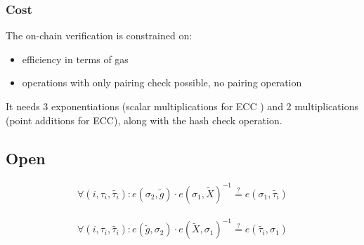 \documentclass[11pt]{article}
\newenvironment{optimization}{\par\color{blue}}{\par}
\begin{document}
    \subsubsection{Cost}
    \begin{optimization}
        The on-chain verification is constrained on:
        \begin{itemize}
            \item efficiency in terms of gas
            \item operations with only pairing check possible, no pairing operation
        \end{itemize}
        It needs 3 exponentiations (scalar multiplications for ECC ) and 2 multiplications (point additions for ECC), along with the hash check operation.
    \end{optimization}

    \subsection{Open}
    \begin{align}
        \forall (i, \tau_i, \tilde{\tau_i}) :
        e(\sigma_2,\tilde{g})\cdot e(\sigma_1, \tilde{X})^{-1}\stackrel{?}{=} e(\sigma_1, \tilde{\tau_i})
    \end{align}
    \begin{optimization}
        \begin{align}
            \forall (i, \tau_i, \tilde{\tau_i}) :
            e(\tilde{g},\sigma_2)\cdot e( \tilde{X}, \sigma_1)^{-1}\stackrel{?}{=} e( \tilde{\tau_i},\sigma_1)
        \end{align}
    \end{optimization}
\end{document}
